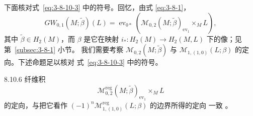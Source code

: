 下面核对式~\eqref{eq:3-8-10-3} 中的符号。回忆，由式
\eqref{eq:3-8-1}，
\[
 GW_{0,1}(M;\widetilde\beta)(L)
 =\operatorname{ev}_{0*}\left(
 \mathcal M_{0,2}(M;\widetilde\beta)_{
 \operatorname{ev}_1}\mathbin{\times_M}L\right),
\]
其中 $\widetilde\beta\in H_2(M)$，而 $\beta$ 是它在映射
$i_*\colon H_2(M)\to H_2(M,L)$ 下的像；见第~\ref{subsec:3-8-1} 小节。
我们需要考察 $\mathcal M_{0,2}(M;\widetilde\beta)$ 与
$\mathcal M_{1,(1,0)}(L;\beta)$ 的定向。下述命题足以核对
式~\eqref{eq:3-8-10-3} 中的符号。

\begin{proposition}{8.10.6}\label{prop:8-10-6}
纤维积
\[
 \mathcal M_{0,2}^{\mathrm{reg}}(M;\widetilde\beta)_{
 \operatorname{ev}_1}\mathbin{\times_M}L
\]
的定向，与把它看作
$(-1)^n\mathcal M_{1,(1,0)}^{\mathrm{reg}}(L;\beta)$ 的边界所得的定向
一致
。
\end{proposition}

